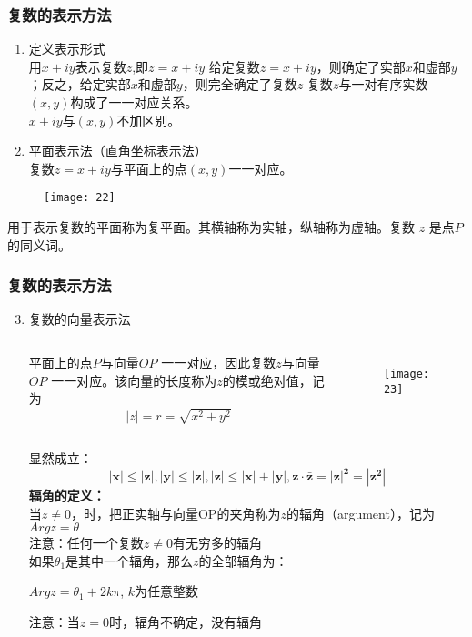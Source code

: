 \documentclass{beamer}
\begin{document}
\begin{frame}[t]
\frametitle{复数的表示方法}
\begin{enumerate}
    \item 定义表示形式\\
用$x + iy$表示复数$z$,即$z = x + iy$
给定复数$z = x + iy$，则确定了实部$x$和虚部$y$；反之，给定实部$x$和虚部$y$，则完全确定了复数$z$-复数$z$与一对有序实数$(x,y)$构成了一一对应关系。\\
\alert{$x + iy$与$(x,y)$不加区别。}

\item 平面表示法（直角坐标表示法）\\

复数$z = x + iy$与平面上的点$(x,y)$一一对应。
\end{enumerate}

\begin{figure}
\centering
\texttt{[image: 22]}
\end{figure}
用于表示复数的平面称为复平面。其横轴称为实轴，纵轴称为虚轴。复数 $z$ 是点$P$的同义词。    
\end{frame}


\begin{frame}[t]
\frametitle{复数的表示方法}
\begin{enumerate}
\setcounter{enumi}{2}
\item 复数的向量表示法\\
\begin{columns}
平面上的点$P$与向量$OP$ 一一对应，因此复数$z$与向量$OP$ 一一对应。该向量的长度称为$z$的模或绝对值，记为\\
$$|z| = r =\sqrt{x^2 + y^2}$$
\begin{figure}[htbp]
\texttt{[image: 23]}
\end{figure}
\end{columns}

显然成立：
$$\mathbf{|x| \leq |z|, |y| \leq |z|},\mathbf{|z| \leq |x| + |y| ,  z \cdot \bar{z} = |z|^2 = |z^2|}
$$
\textbf{辐角的定义：}\\
当$z \neq 0$，时，把正实轴与向量OP的夹角称为$z$的辐角（argument），记为$Argz = \theta$\\
\alert{注意：任何一个复数$z \neq 0$有无穷多的辐角}
\\如果$\theta_1$是其中一个辐角，那么$z$的全部辐角为：\\
\begin{center}
$Argz = \theta_1 + 2k\pi $, $k$为任意整数
\end{center}

\alert{注意：当$z = 0$时，辐角不确定，没有辐角}

\end{enumerate}

\end{frame}
\end{document}
